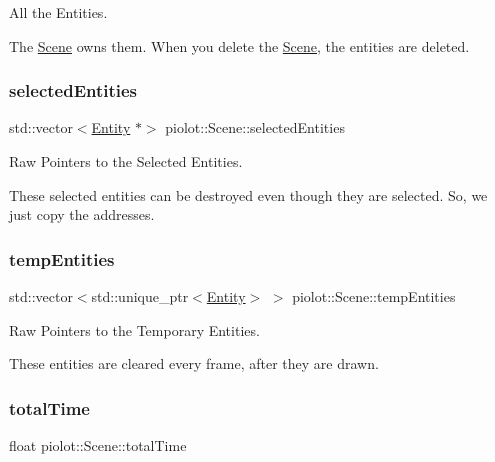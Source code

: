 All the Entities. 

The \mbox{\hyperlink{classpiolot_1_1_scene}{Scene}} owns them. When you delete the \mbox{\hyperlink{classpiolot_1_1_scene}{Scene}}, the entities are deleted. \mbox{\label{classpiolot_1_1_scene_a62abd7ccaa90a04e1f9738de7b2f96d3}} 
\subsubsection{\texorpdfstring{selected\+Entities}{selectedEntities}}
{\footnotesize\ttfamily std\+::vector$<$\mbox{\hyperlink{classpiolot_1_1_entity}{Entity}} $\ast$$>$ piolot\+::\+Scene\+::selected\+Entities\hspace{0.3cm}{\ttfamily [protected]}}



Raw Pointers to the Selected Entities. 

These selected entities can be destroyed even though they are selected. So, we just copy the addresses. \mbox{\label{classpiolot_1_1_scene_afb5dae5e574ec94da2b1192070e91327}} 
\subsubsection{\texorpdfstring{temp\+Entities}{tempEntities}}
{\footnotesize\ttfamily std\+::vector$<$std\+::unique\+\_\+ptr$<$\mbox{\hyperlink{classpiolot_1_1_entity}{Entity}}$>$ $>$ piolot\+::\+Scene\+::temp\+Entities\hspace{0.3cm}{\ttfamily [protected]}}



Raw Pointers to the Temporary Entities. 

These entities are cleared every frame, after they are drawn. \mbox{\label{classpiolot_1_1_scene_a10140d7b13ab259d8770d9cf44ab8829}} 
\subsubsection{\texorpdfstring{total\+Time}{totalTime}}
{\footnotesize\ttfamily float piolot\+::\+Scene\+::total\+Time\hspace{0.3cm}{\ttfamily [protected]}}



